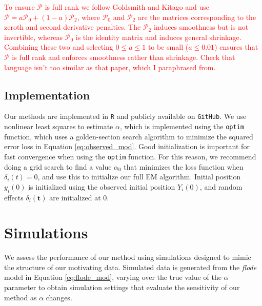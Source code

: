 \documentclass[preprint]{JASA}
\begin{document}
\textcolor{red}{
To ensure $\mathcal{P}$ is full rank we follow Goldsmith and Kitago and use $\mathcal{P} = a\mathcal{P}_0 + (1-a)\mathcal{P}_2$, where $\mathcal{P}_0$ and $\mathcal{P}_2$ are the matrices corresponding to the zeroth and second derivative penalties.  The $\mathcal{P}_2$ induces smoothness but is not invertible, whereas $\mathcal{P}_0$ is the identity matrix and induces general shrinkage. Combining these two and selecting $0\le a \le 1$ to be small ($a \le 0.01$) ensures that $\mathcal{P}$ is full rank and enforces smoothness rather than shrinkage. Check that language isn't too similar as that paper, which I paraphrased from.
}

\hypertarget{implementation}{%
\subsection{Implementation}\label{implementation}}

Our methods are implemented in \texttt{R} and publicly available on
\texttt{GitHub}. We use nonlinear least squares to estimate \(\alpha\),
which is implemented using the \texttt{optim} function, which uses a
golden-section search algorithm to minimize the squared error loss in
Equation \ref{eq:observed_mod}. Good initialization is important for
fast convergence when using the \texttt{optim} function. For this
reason, we recommend doing a grid search to find a value \(\alpha_0\)
that minimizes the loss function when \(\delta_i(t) = 0\), and use this
to initialize our full EM algorithm. Initial position \(y_i(0)\) is
initialized using the observed initial position \(Y_i(0)\), and random
effects \(\delta_i(\mathbf{t})\) are initialized at 0.

\hypertarget{simulations}{%
\section{Simulations}\label{simulations}}

\label{sec:simulations}

We assess the performance of our method using simulations designed to
mimic the structure of our motivating data. Simulated data is generated
from the \emph{flode} model in Equation \ref{eq:flode_mod}, varying over
the true value of the \(\alpha\) parameter to obtain simulation settings
that evaluate the sensitivity of our method as \(\alpha\) changes.
\end{document}
